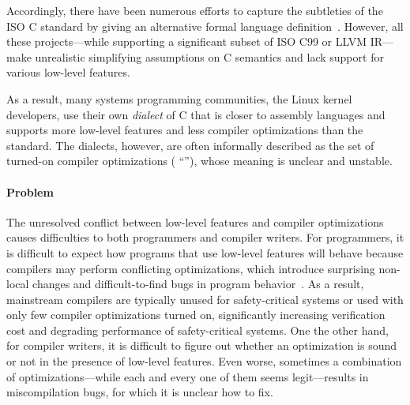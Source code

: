 Accordingly, there have been numerous efforts to capture the subtleties of the ISO C standard by
giving an alternative formal language
definition~\cite{leroy:compcert,vellvm,ellison2012executable,norrish1998c,krebbers}.  However, all
these projects---while supporting a significant subset of ISO C99 or LLVM IR---make unrealistic
simplifying assumptions on C semantics and lack support for various low-level features.


As a result, many systems programming communities, \eg{} the Linux kernel developers, use their own
\emph{dialect} of C that is closer to assembly languages and supports more low-level features and
less compiler optimizations than the standard.  The dialects, however, are often informally
described as the set of turned-on compiler optimizations (\eg{} ``''), whose meaning
is unclear and unstable.


\paragraph{Problem}


The unresolved conflict between low-level features and compiler optimizations causes difficulties to
both programmers and compiler writers.  For programmers, it is difficult to expect how programs that
use low-level features will behave because compilers may perform conflicting optimizations, which
introduce surprising non-local changes and difficult-to-find bugs in program
behavior~\cite{wang2013towards,yang2011finding}.  As a result, mainstream compilers are typically
unused for safety-critical systems or used with only few compiler optimizations turned on,
significantly increasing verification cost and degrading performance of safety-critical systems.
One the other hand, for compiler writers, it is difficult to figure out whether an optimization is
sound or not in the presence of low-level features.  Even worse, sometimes a combination of
optimizations---while each and every one of them seems legit---results in miscompilation bugs, for
which it is unclear how to fix.



